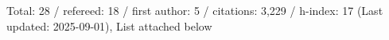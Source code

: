 Total: 28 / refereed: 18 / first author: 5 / citations: 3,229 / h-index: 17 (Last updated: 2025-09-01), List attached below